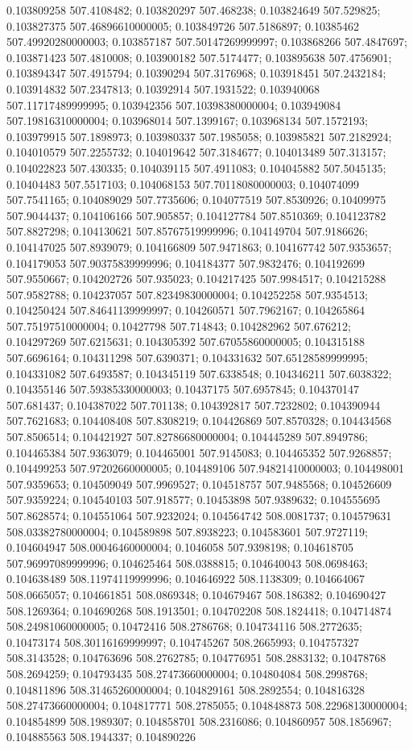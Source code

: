 0.103809258 507.4108482; 0.103820297 507.468238; 0.103824649 507.529825; 0.103827375 507.46896610000005; 0.103849726 507.5186897; 0.10385462 507.49920280000003; 0.103857187 507.50147269999997; 0.103868266 507.4847697; 0.103871423 507.4810008; 0.103900182 507.5174477; 0.103895638 507.4756901; 0.103894347 507.4915794; 0.10390294 507.3176968; 0.103918451 507.2432184; 0.103914832 507.2347813; 0.10392914 507.1931522; 0.103940068 507.11717489999995; 0.103942356 507.10398380000004; 0.103949084 507.19816310000004; 0.103968014 507.1399167; 0.103968134 507.1572193; 0.103979915 507.1898973; 0.103980337 507.1985058; 0.103985821 507.2182924; 0.104010579 507.2255732; 0.104019642 507.3184677; 0.104013489 507.313157; 0.104022823 507.430335; 0.104039115 507.4911083; 0.104045882 507.5045135; 0.10404483 507.5517103; 0.104068153 507.70118080000003; 0.104074099 507.7541165; 0.104089029 507.7735606; 0.104077519 507.8530926; 0.10409975 507.9044437; 0.104106166 507.905857; 0.104127784 507.8510369; 0.104123782 507.8827298; 0.104130621 507.85767519999996; 0.104149704 507.9186626; 0.104147025 507.8939079; 0.104166809 507.9471863; 0.104167742 507.9353657; 0.104179053 507.90375839999996; 0.104184377 507.9832476; 0.104192699 507.9550667; 0.104202726 507.935023; 0.104217425 507.9984517; 0.104215288 507.9582788; 0.104237057 507.82349830000004; 0.104252258 507.9354513; 0.104250424 507.84641139999997; 0.104260571 507.7962167; 0.104265864 507.75197510000004; 0.10427798 507.714843; 0.104282962 507.676212; 0.104297269 507.6215631; 0.104305392 507.67055860000005; 0.104315188 507.6696164; 0.104311298 507.6390371; 0.104331632 507.65128589999995; 0.104331082 507.6493587; 0.104345119 507.6338548; 0.104346211 507.6038322; 0.104355146 507.59385330000003; 0.10437175 507.6957845; 0.104370147 507.681437; 0.104387022 507.701138; 0.104392817 507.7232802; 0.104390944 507.7621683; 0.104408408 507.8308219; 0.104426869 507.8570328; 0.104434568 507.8506514; 0.104421927 507.82786680000004; 0.104445289 507.8949786; 0.104465384 507.9363079; 0.104465001 507.9145083; 0.104465352 507.9268857; 0.104499253 507.97202660000005; 0.104489106 507.94821410000003; 0.104498001 507.9359653; 0.104509049 507.9969527; 0.104518757 507.9485568; 0.104526609 507.9359224; 0.104540103 507.918577; 0.10453898 507.9389632; 0.104555695 507.8628574; 0.104551064 507.9232024; 0.104564742 508.0081737; 0.104579631 508.03382780000004; 0.104589898 507.8938223; 0.104583601 507.9727119; 0.104604947 508.00046460000004; 0.1046058 507.9398198; 0.104618705 507.96997089999996; 0.104625464 508.0388815; 0.104640043 508.0698463; 0.104638489 508.11974119999996; 0.104646922 508.1138309; 0.104664067 508.0665057; 0.104661851 508.0869348; 0.104679467 508.186382; 0.104690427 508.1269364; 0.104690268 508.1913501; 0.104702208 508.1824418; 0.104714874 508.24981060000005; 0.10472416 508.2786768; 0.104734116 508.2772635; 0.10473174 508.30116169999997; 0.104745267 508.2665993; 0.104757327 508.3143528; 0.104763696 508.2762785; 0.104776951 508.2883132; 0.10478768 508.2694259; 0.104793435 508.27473660000004; 0.104804084 508.2998768; 0.104811896 508.31465260000004; 0.104829161 508.2892554; 0.104816328 508.27473660000004; 0.104817771 508.2785055; 0.104848873 508.22968130000004; 0.104854899 508.1989307; 0.104858701 508.2316086; 0.104860957 508.1856967; 0.104885563 508.1944337; 0.104890226 